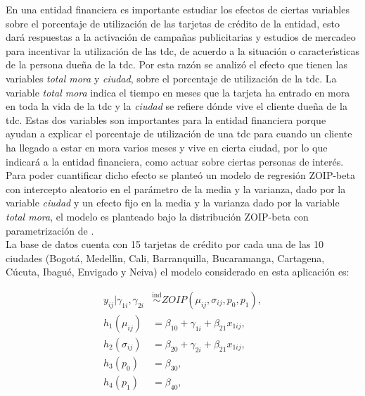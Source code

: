 En una entidad financiera es importante estudiar los efectos de ciertas variables sobre el porcentaje de utilizaci\'{o}n de las tarjetas de cr\'{e}dito de la entidad, esto dar\'{a} respuestas a la activaci\'{o}n de campa\~{n}as publicitarias y estudios de mercadeo para incentivar la utilizaci\'{o}n de las tdc, de acuerdo a la situaci\'{o}n o caracter\'{\i}sticas de la persona due\~{n}a de la tdc. Por esta raz\'{o}n se analiz\'{o} el efecto que tienen las variables \textsl{total mora} y \textsl{ciudad}, sobre el porcentaje de utilizaci\'{o}n de la tdc. La variable \textsl{total mora} indica el tiempo en meses que la tarjeta ha entrado en mora en toda la vida de la tdc y la \textsl{ciudad} se refiere d\'{o}nde vive el cliente due\~{n}a de la tdc. Estas dos variables son importantes para la entidad financiera porque ayudan a explicar el porcentaje de utilizaci\'{o}n de una tdc para cuando un cliente ha llegado a estar en mora varios meses y vive en cierta ciudad, por lo que indicar\'{a} a la entidad financiera, como actuar sobre ciertas personas de inter\'{e}s. Para poder cuantificar dicho efecto se plante\'{o} un modelo de regresi\'{o}n ZOIP-beta con intercepto aleatorio en el par\'{a}metro de la media y la varianza, dado por la variable \textsl{ciudad} y un efecto fijo en la media y la varianza dado por la variable \textsl{total mora}, el modelo es planteado bajo la distribuci\'{o}n ZOIP-beta con parametrizaci\'{o}n de \cite{Stasinopoulos2}.\\

La base de datos cuenta con 15 tarjetas de cr\'{e}dito por cada una de las 10 ciudades (Bogot\'{a}, Medell\'{\i}n, Cali, Barranquilla, Bucaramanga, Cartagena, C\'{u}cuta, Ibagu\'{e}, Envigado y Neiva) el modelo considerado en esta aplicaci\'{o}n es:

\begin{equation}
\begin{split}
y_{ij}| \gamma_{1i},\gamma_{2i} &\overset{\text{ind}}{\sim} ZOIP(\mu_{ij},\sigma_{ij},p_0, p_1),\\
h_1(\mu_{ij})&=\beta_{10}+\gamma_{1i}+\beta_{21} x_{1ij},\\
h_2(\sigma_{ij})&=\beta_{20}+\gamma_{2i}+\beta_{21} x_{1ij},\\
h_3(p_{0})&=\beta_{30},\\
h_4(p_{1})&=\beta_{40},
\end{split}
\label{A_eq_reg_mix}
\end{equation}

